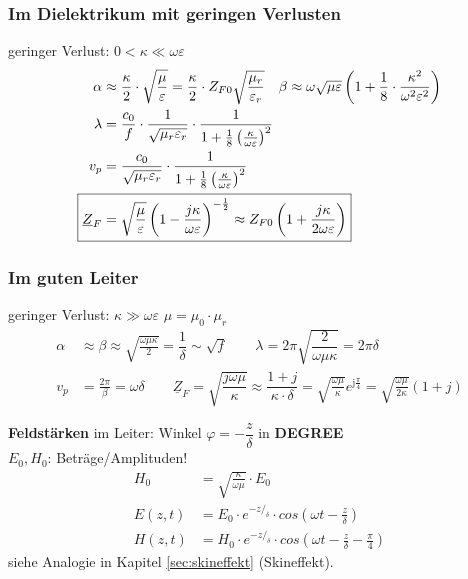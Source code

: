 \subsubsection{Im Dielektrikum mit geringen Verlusten}
geringer Verlust: $0 < \kappa \ll\omega\varepsilon$
\begin{align*}
	\alpha                  & \approx\dfrac{\kappa}{2}\cdot\sqrt{\dfrac{\mu}{\varepsilon}} = \frac{\kappa}{2}\cdot Z_{F0}\sqrt{\frac{\mu_r}{\varepsilon_r}}  \quad
	\beta \approx\omega\sqrt{\mu\varepsilon}\left(1+\dfrac{1}{8}\cdot\dfrac{\kappa^2}{\omega^2\varepsilon^2}\right)                                                                      \\
	\lambda                 & = \dfrac{c_0}{f}\cdot\dfrac{1}{\sqrt{\mu_r\varepsilon_r}}\cdot\frac{1}{1+\frac{1}{8}\left(\frac{\kappa}{\omega\varepsilon}\right)^2}                       \\
	v_p                     & = \dfrac{c_0}{\sqrt{\mu_r\varepsilon_r}}\cdot\frac{1}{1+\frac{1}{8}\left(\frac{\kappa}{\omega\varepsilon}\right)^2}                                        \\
	\Aboxed{\underline{Z}_F & = \sqrt{\dfrac{\mu}{\varepsilon}}\left(1-\frac{j\kappa}{\omega\varepsilon}\right)^{-\frac{1}{2}} \approx Z_{F0}\left(1+\frac{j\kappa}{2\omega\varepsilon}\right)}
\end{align*}

\subsubsection{Im guten Leiter}\label{sec:Ausbreitug_guter_Leiter}
geringer Verlust: $\kappa \gg\omega\varepsilon$ \quad $\mu = \mu_0 \cdot \mu_r$
\begin{align*}
	\alpha & \approx \beta \approx\sqrt{\frac{\omega\mu\kappa}{2}}=\dfrac{1}{\delta}\sim\sqrt{f} \qquad
	\lambda                 = 2\pi \sqrt{\dfrac{2}{\omega\mu\kappa}}=2\pi\delta                         \\
	v_p    & = \frac{2\pi}{\beta} = \omega\delta        \qquad
	\boxed{\underline{Z}_F = \sqrt{\dfrac{j\omega\mu}{\kappa}} \approx \dfrac{1+j}{\kappa\cdot\delta} = \sqrt{\frac{\omega \mu}{\kappa}}e^{\mathrm{j}\frac{\pi}{4}} = \sqrt{\frac{\omega \mu}{2 \kappa}}(1+j)   }
\end{align*}

\textbf{Feldstärken} im Leiter: \qquad Winkel $\varphi = - \dfrac{z}{\delta}$ in \textbf{DEGREE}\\
$E_0, H_0$: Beträge/Amplituden!
\begin{align*}
	H_0    & = \sqrt{\frac{\kappa}{\omega \mu}}\cdot E_0                                    \\
	E(z,t) & = E_0 \cdot e^{- z/_\delta}\cdot cos(\omega t-\frac{z}{\delta})                \\
	H(z,t) & = H_0 \cdot e^{- z/_\delta}\cdot cos(\omega t- \frac{z}{\delta}-\frac{\pi}{4})
\end{align*}
siehe Analogie in Kapitel \ref{sec:skineffekt} (Skineffekt).
